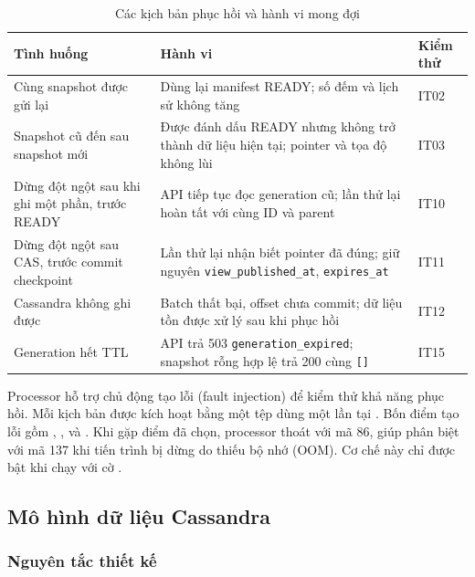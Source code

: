 \begin{table}[H]
\centering
\tablefont
\caption{Các kịch bản phục hồi và hành vi mong đợi}
\label{tab:recovery}
\begin{tabular}{p{4.58cm}p{8.96cm}p{1.59cm}}
\toprule
\textbf{Tình huống} & \textbf{Hành vi} & \textbf{Kiểm thử} \\
\midrule
Cùng snapshot được gửi lại & Dùng lại manifest READY; số đếm và lịch sử không tăng & IT02 \\
Snapshot cũ đến sau snapshot mới & Được đánh dấu READY nhưng không trở thành dữ liệu hiện tại; pointer và tọa độ không lùi & IT03 \\
Dừng đột ngột sau khi ghi một phần, trước READY & API tiếp tục đọc generation cũ; lần thử lại hoàn tất với cùng ID và parent & IT10 \\
Dừng đột ngột sau CAS, trước commit checkpoint & Lần thử lại nhận biết pointer đã đúng; giữ nguyên \texttt{view\_published\_at}, \texttt{expires\_at} & IT11 \\
Cassandra không ghi được & Batch thất bại, offset chưa commit; dữ liệu tồn được xử lý sau khi phục hồi & IT12 \\
Generation hết TTL & API trả 503 \texttt{generation\_expired}; snapshot rỗng hợp lệ trả 200 cùng \texttt{[]} & IT15 \\
\bottomrule
\end{tabular}
\end{table}

Processor hỗ trợ chủ động tạo lỗi (fault injection) để kiểm thử khả năng phục hồi. Mỗi kịch bản được kích hoạt bằng một tệp dùng một lần tại . Bốn điểm tạo lỗi gồm , ,  và . Khi gặp điểm đã chọn, processor thoát với mã 86, giúp phân biệt với mã 137 khi tiến trình bị dừng do thiếu bộ nhớ (OOM). Cơ chế này chỉ được bật khi chạy với cờ .

\subsection{Mô hình dữ liệu Cassandra}

\subsubsection{Nguyên tắc thiết kế}


